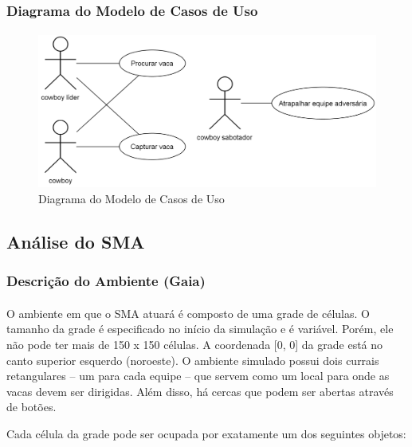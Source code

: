 \documentclass{llncs}
\begin{document}
\subsubsection{Diagrama do Modelo de Casos de Uso}

\paragraph{ }

\begin{figure}[!ht]
\centering 
\includegraphics[width=15cm]{images/usecase.png}
\caption{Diagrama do Modelo de Casos de Uso}
\end{figure}

\subsection{Análise do SMA}


\subsubsection{Descrição do Ambiente (Gaia)}

\paragraph{ }
O ambiente em que o SMA atuará é composto de uma grade de células. O tamanho da grade é especificado no início da simulação e é variável. Porém, ele não pode ter mais de 150 x 150 células. A coordenada [0, 0] da grade está no canto superior esquerdo (noroeste). O ambiente simulado possui dois currais retangulares – um para cada equipe – que servem como um local para onde as vacas devem ser dirigidas. Além disso, há cercas que podem ser abertas através de botões.

Cada célula da grade pode ser ocupada por exatamente um dos seguintes objetos:
\end{document}
